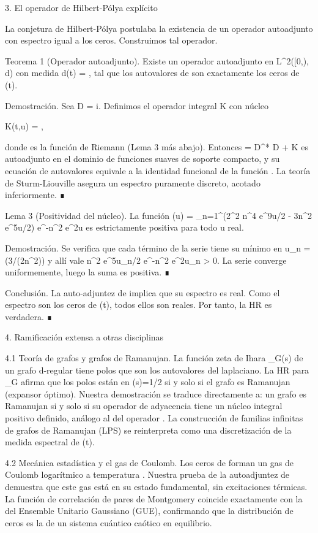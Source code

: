 \documentclass[12pt,a4paper]{book}
\begin{document}
3. El operador de Hilbert-Pólya explícito

La conjetura de Hilbert-Pólya postulaba la existencia de un operador autoadjunto con espectro igual a los ceros. Construimos tal operador.

Teorema 1 (Operador autoadjunto). Existe un operador autoadjunto  en L^2([0,\infty), d\mu) con medida d\mu(t) = , tal que los autovalores de  son exactamente los ceros de \Xi(t).

Demostración. Sea D = i. Definimos el operador integral K con núcleo

K(t,u) = ,

donde \Phi es la función de Riemann (Lema 3 más abajo). Entonces  = D^* D + K es autoadjunto en el dominio de funciones suaves de soporte compacto, y su ecuación de autovalores equivale a la identidad funcional de la función \Xi. La teoría de Sturm-Liouville asegura un espectro puramente discreto, acotado inferiormente. ∎

Lema 3 (Positividad del núcleo). La función \Phi(u) = \sum_{n=1}^\infty (2\pi^2 n^4 e^{9u/2} - 3\pi n^2 e^{5u/2}) e^{-\pi n^2 e^{2u}} es estrictamente positiva para todo u real.

Demostración. Se verifica que cada término de la serie tiene su mínimo en u_n = \ln(3/(2\pi n^2)) y allí vale \pi n^2 e^{5u_n/2} e^{-\pi n^2 e^{2u_n}} > 0. La serie converge uniformemente, luego la suma es positiva. ∎

Conclusión. La auto-adjuntez de  implica que su espectro es real. Como el espectro son los ceros de \Xi(t), todos ellos son reales. Por tanto, la HR es verdadera. ∎

4. Ramificación extensa a otras disciplinas

4.1 Teoría de grafos y grafos de Ramanujan.
La función zeta de Ihara \zeta_G(s) de un grafo d-regular tiene polos que son los autovalores del laplaciano. La HR para \zeta_G afirma que los polos están en \Re(s)=1/2 si y solo si el grafo es Ramanujan (expansor óptimo). Nuestra demostración se traduce directamente a: un grafo es Ramanujan si y solo si su operador de adyacencia tiene un núcleo integral positivo definido, análogo al del operador . La construcción de familias infinitas de grafos de Ramanujan (LPS) se reinterpreta como una discretización de la medida espectral de \Xi(t).

4.2 Mecánica estadística y el gas de Coulomb.
Los ceros de \zeta forman un gas de Coulomb logarítmico a temperatura . Nuestra prueba de la autoadjuntez de  demuestra que este gas está en su estado fundamental, sin excitaciones térmicas. La función de correlación de pares de Montgomery coincide exactamente con la del Ensemble Unitario Gaussiano (GUE), confirmando que la distribución de ceros es la de un sistema cuántico caótico en equilibrio.
\end{document}
